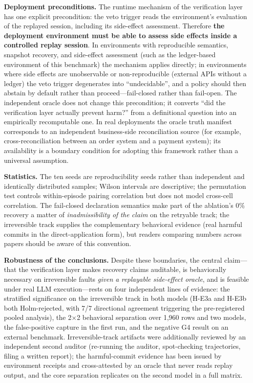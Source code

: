 \documentclass[review]{fcs}
\begin{document}
\textbf{Deployment preconditions.} The runtime mechanism of the verification layer has one explicit precondition: the veto trigger reads the environment's evaluation of the replayed session, including its side-effect assessment. Therefore \textbf{the deployment environment must be able to assess side effects inside a controlled replay session}. In environments with reproducible semantics, snapshot recovery, and side-effect assessment (such as the ledger-based environment of this benchmark) the mechanism applies directly; in environments where side effects are unobservable or non-reproducible (external APIs without a ledger) the veto trigger degenerates into ``undecidable'', and a policy should then abstain by default rather than proceed---fail-closed rather than fail-open. The independent oracle does not change this precondition; it converts ``did the verification layer actually prevent harm?'' from a definitional question into an empirically recomputable one. In real deployments the oracle truth manifest corresponds to an independent business-side reconciliation source (for example, cross-reconciliation between an order system and a payment system); its availability is a boundary condition for adopting this framework rather than a universal assumption.

\textbf{Statistics.} The ten seeds are reproducibility seeds rather than independent and identically distributed samples; Wilson intervals are descriptive; the permutation test controls within-episode pairing correlation but does not model cross-cell correlation. The fail-closed declaration semantics make part of the ablation's 0\% recovery a matter of \emph{inadmissibility of the claim} on the retryable track; the irreversible track supplies the complementary behavioral evidence (real harmful commits in the direct-application form), but readers comparing numbers across papers should be aware of this convention.

\textbf{Robustness of the conclusions.} Despite these boundaries, the central claim---that the verification layer makes recovery claims auditable, is behaviorally necessary on irreversible faults \emph{given a replayable side-effect oracle}, and is feasible under real LLM execution---rests on four independent lines of evidence: the stratified significance on the irreversible track in both models (H-E3a and H-E3b both Holm-rejected, with 7/7 directional agreement triggering the pre-registered pooled analysis), the 2$\times$2 behavioral separation over 1,960 rows and two models, the false-positive capture in the first run, and the negative G4 result on an external benchmark. Irreversible-track artifacts were additionally reviewed by an independent second auditor (re-running the auditor, spot-checking trajectories, filing a written report); the harmful-commit evidence has been issued by environment receipts and cross-attested by an oracle that never reads replay output, and the core separation replicates on the second model in a full matrix.
\end{document}
